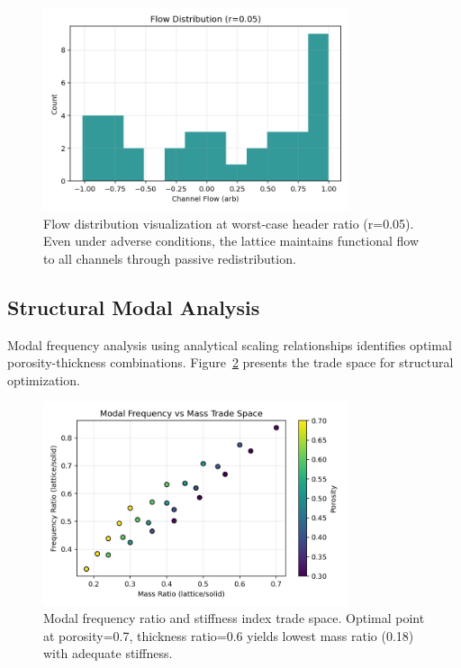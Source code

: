 \begin{figure}[H]
    \centering
    \includegraphics[width=0.8\textwidth]{figures/simulations/flow_distribution_worst_case.png}
    \caption{Flow distribution visualization at worst-case header ratio (r=0.05). Even under adverse conditions, the lattice maintains functional flow to all channels through passive redistribution.}
    \label{fig:flow_uniformity}
\end{figure}

\subsection{Structural Modal Analysis}

Modal frequency analysis using analytical scaling relationships identifies optimal porosity-thickness combinations. Figure~\ref{fig:modal_trade} presents the trade space for structural optimization.

\begin{figure}[H]
    \centering
    \includegraphics[width=0.8\textwidth]{figures/simulations/modal_frequency_trade.png}
    \caption{Modal frequency ratio and stiffness index trade space. Optimal point at porosity=0.7, thickness ratio=0.6 yields lowest mass ratio (0.18) with adequate stiffness.}
    \label{fig:modal_trade}
\end{figure}

